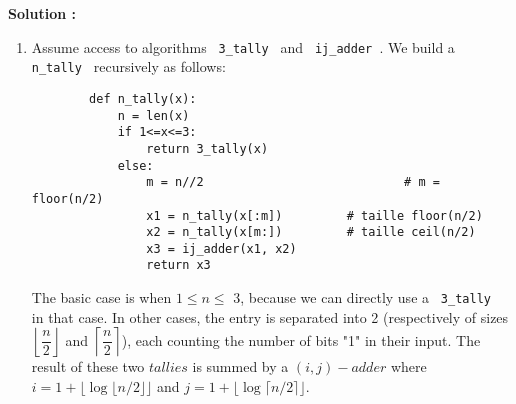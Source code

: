 \documentclass[11pt]{article} %
\newenvironment{solution}[1][\unskip]{%
	\par
	\noindent
	\textbf{Solution #1:}
	\noindent}
{\medskip}
\begin{document}
	
	\begin{solution}
		\begin{enumerate}
		
		\item{Assume access to algorithms \verb | 3_tally | and \verb | ij_adder |. We build a \verb | n_tally | recursively as follows:} 	
		
		\begin{lstlisting}
		def n_tally(x):
			n = len(x)
			if 1<=x<=3:
				return 3_tally(x)
			else:
				m = n//2							# m = floor(n/2)
				x1 = n_tally(x[:m])			# taille floor(n/2)
				x2 = n_tally(x[m:])			# taille ceil(n/2)
				x3 = ij_adder(x1, x2)
				return x3
		\end{lstlisting}
		
		The basic case is when $ 1 \leq n \leq $ 3, because we can directly use a \verb | 3_tally | in that case. In other cases, the entry is separated into 2 (respectively of sizes $ \left \lfloor \dfrac {n} {2} \right \rfloor $ and $ \left \lceil \dfrac {n} {2} \right \rceil $), each counting the number of bits "1" in their input. The result of these two $ tallies $ is summed by a $ (i, j) -adder $ where $ i = 1 + \lfloor \log \lfloor n / 2 \rfloor \rfloor $ and $ j = 1 + \lfloor \log \lceil n / 2 \rceil \rfloor $.
		

\end{enumerate}
\end{solution}
\end{document}
